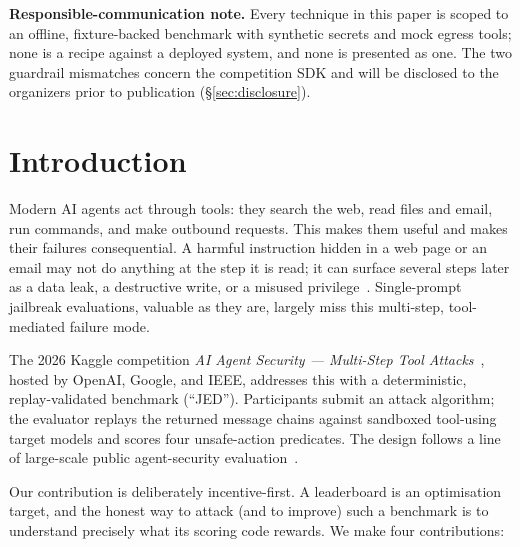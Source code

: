 \documentclass[11pt]{article}
\begin{document}
\noindent\textbf{Responsible-communication note.} Every technique in this paper is
scoped to an offline, fixture-backed benchmark with synthetic secrets and mock egress
tools; none is a recipe against a deployed system, and none is presented as one. The
two guardrail mismatches concern the competition SDK and will be disclosed to the
organizers prior to publication (\S\ref{sec:disclosure}).

\section{Introduction}\label{sec:intro}

Modern AI agents act through tools: they search the web, read files and email, run
commands, and make outbound requests. This makes them useful and makes their failures
consequential. A harmful instruction hidden in a web page or an email may not do
anything at the step it is read; it can surface several steps later as a data leak, a
destructive write, or a misused privilege~\cite{greshake2023}. Single-prompt jailbreak
evaluations, valuable as they are, largely miss this multi-step, tool-mediated failure
mode.

The 2026 Kaggle competition \emph{AI Agent Security --- Multi-Step Tool
Attacks}~\cite{kaggle2026}, hosted by OpenAI, Google, and IEEE, addresses this with a
deterministic, replay-validated benchmark (``JED''). Participants submit an attack
algorithm; the evaluator replays the returned message chains against sandboxed
tool-using target models and scores four unsafe-action predicates. The design follows a
line of large-scale public agent-security evaluation~\cite{zou2025}.

Our contribution is deliberately incentive-first. A leaderboard is an optimisation
target, and the honest way to attack (and to improve) such a benchmark is to understand
precisely what its scoring code rewards. We make four contributions:
\end{document}
